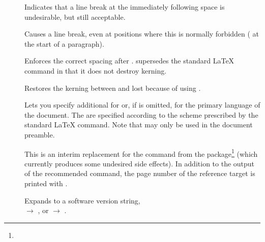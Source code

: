 \begin{description}
\item[\latexcmd{\hardbreak}] \enforcenewline%
  Indicates that a line break at the immediately following space is
  undesirable, but still acceptable.

\item[\latexcmd{\enforcenewline}] \enforcenewline%
  Causes a line break, even at positions where this is normally forbidden
  (\EG{} at the start of a paragraph).

\item[] \enforcenewline%
  Enforces the correct spacing after
  . \latexcmd{\p} supersedes the standard
  \LaTeX{} \latexcmd{\@} command in that it does not destroy kerning.

\item[]
  \enforcenewline%
  Restores the kerning between  and
   lost because of using .

\item[]
  \enforcenewline%
  Lets you specify additional  for
   or, if  is omitted, for
  the primary language of the document. The 
  are specified according to the scheme prescribed by the standard \LaTeX{}
  \latexcmd{\hyphenation} command. Note that \latexcmd{\SetUpHyphenation}
  may only be used in the document preamble.

\item[] \enforcenewline%
  This is an interim replacement for the \latexcmd{\vref{}} command from
  the 
  package\footnote{}
  (which currently produces some undesired side effects). In addition to
  the output of the recommended \latexcmd{\autoref} command, the page
  number of the reference target is printed with \latexcmd{\fullautoref}.

\item[]
  \enforcenewline%
  Expands to a software version string, \EG{} \\
   $\rightarrow$
  , or \newline
   $\rightarrow$
   \p.


\end{description}

